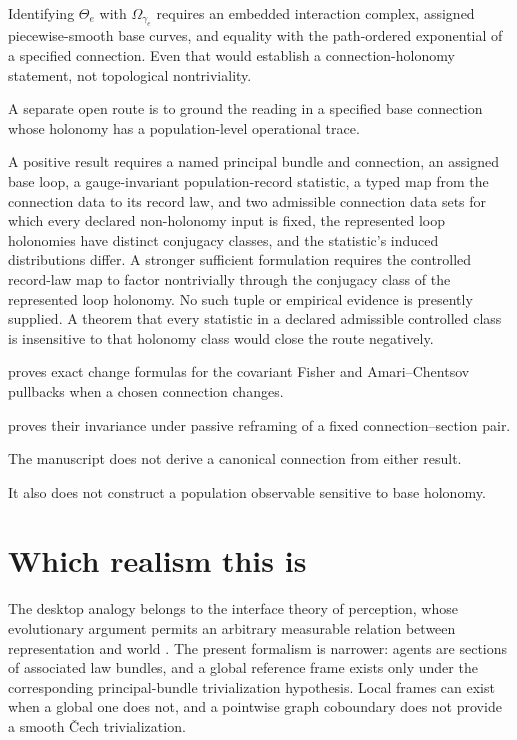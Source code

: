Identifying \(\Theta_e\) with
\(\Omega_{\gamma_e}\) requires an embedded interaction complex, assigned
piecewise-smooth base curves, and equality with the path-ordered exponential
of a specified connection.  Even that would establish a connection-holonomy
statement, not topological nontriviality. 

A separate open route is to ground the reading in a specified base connection
whose holonomy has a population-level operational trace. 

A
positive result requires a named principal bundle and connection, an assigned
base loop, a gauge-invariant population-record statistic, a typed map from the
connection data to its record law, and two admissible connection data sets for
which every declared non-holonomy input is fixed, the represented loop
holonomies have distinct conjugacy classes, and the statistic's induced
distributions differ.  A stronger sufficient formulation requires the
controlled record-law map to factor nontrivially through the conjugacy class
of the represented loop holonomy.  No such tuple or
empirical evidence is presently supplied.  A theorem that every statistic in
a declared admissible controlled class is insensitive to that holonomy class
would close the route negatively. 

 proves exact change formulas for the
covariant Fisher and Amari--Chentsov pullbacks when a chosen connection
changes. 

 proves their invariance under passive
reframing of a fixed connection--section pair. 

The manuscript does not derive a canonical connection from either result.

It also does not construct a population observable sensitive to base holonomy.

\section{Which realism this is}
\label{sec:phil-realism}

The desktop analogy belongs to the interface theory of perception, whose
evolutionary argument permits an arbitrary measurable relation between
representation and world \citep{Hoffman2015,Hoffman2019}.  The present
formalism is narrower: agents are sections of associated law bundles, and a
global reference frame exists only under the corresponding principal-bundle
trivialization hypothesis.  Local frames can exist when a global one does
not, and a pointwise graph coboundary does not provide a smooth
\v{C}ech trivialization. 


